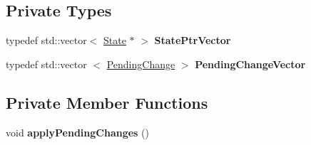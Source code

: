 \subsection*{\-Private \-Types}
\begin{DoxyCompactItemize}
\item 
\hypertarget{classStateStack_a98d8e25ed9ad5889b145982b8a167cf0_a98d8e25ed9ad5889b145982b8a167cf0}{typedef std\-::vector$<$ \hyperlink{classState}{\-State} $\ast$ $>$ {\bfseries \-State\-Ptr\-Vector}}\label{classStateStack_a98d8e25ed9ad5889b145982b8a167cf0_a98d8e25ed9ad5889b145982b8a167cf0}

\item 
\hypertarget{classStateStack_aa3a35524fb99f5d12b4276bdf2a56744_aa3a35524fb99f5d12b4276bdf2a56744}{typedef std\-::vector\*
$<$ \hyperlink{structStateStack_1_1PendingChange}{\-Pending\-Change} $>$ {\bfseries \-Pending\-Change\-Vector}}\label{classStateStack_aa3a35524fb99f5d12b4276bdf2a56744_aa3a35524fb99f5d12b4276bdf2a56744}

\end{DoxyCompactItemize}
\subsection*{\-Private \-Member \-Functions}
\begin{DoxyCompactItemize}
\item 
\hypertarget{classStateStack_af664f95954b4621175c9fc0f9d30fdf0_af664f95954b4621175c9fc0f9d30fdf0}{void {\bfseries apply\-Pending\-Changes} ()}\label{classStateStack_af664f95954b4621175c9fc0f9d30fdf0_af664f95954b4621175c9fc0f9d30fdf0}

\end{DoxyCompactItemize}

